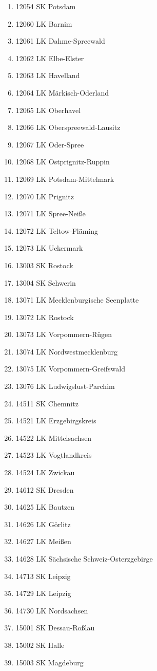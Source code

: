 \begin{enumerate}[itemsep=-6mm]
\item 12054 SK Potsdam
\item 12060 LK Barnim
\item 12061 LK Dahme-Spreewald
\item 12062 LK Elbe-Elster
\item 12063 LK Havelland
\item 12064 LK Märkisch-Oderland
\item 12065 LK Oberhavel
\item 12066 LK Oberspreewald-Lausitz
\item 12067 LK Oder-Spree
\item 12068 LK Ostprignitz-Ruppin
\item 12069 LK Potsdam-Mittelmark
\item 12070 LK Prignitz
\item 12071 LK Spree-Neiße
\item 12072 LK Teltow-Fläming
\item 12073 LK Uckermark
\item 13003 SK Rostock
\item 13004 SK Schwerin
\item 13071 LK Mecklenburgische Seenplatte
\item 13072 LK Rostock
\item 13073 LK Vorpommern-Rügen
\item 13074 LK Nordwestmecklenburg
\item 13075 LK Vorpommern-Greifswald
\item 13076 LK Ludwigslust-Parchim
\item 14511 SK Chemnitz
\item 14521 LK Erzgebirgskreis
\item 14522 LK Mittelsachsen
\item 14523 LK Vogtlandkreis
\item 14524 LK Zwickau
\item 14612 SK Dresden
\item 14625 LK Bautzen
\item 14626 LK Görlitz
\item 14627 LK Meißen
\item 14628 LK Sächsische Schweiz-Osterzgebirge
\item 14713 SK Leipzig
\item 14729 LK Leipzig
\item 14730 LK Nordsachsen
\item 15001 SK Dessau-Roßlau
\item 15002 SK Halle
\item 15003 SK Magdeburg

\end{enumerate}
